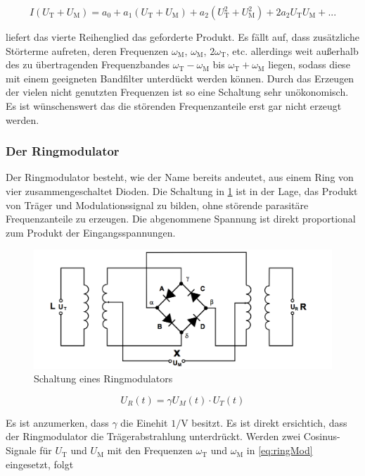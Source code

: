 \begin{equation}
I(U_\text{T} + U_\text{M}) = a_0 + a_1(U_\text{T} + U_\text{M}) + a_2(U_\text{T}^2 + U_\text{M}^2) + 2a_2 U_\text{T} U_\text{M} + ...
\end{equation}

\noindent liefert das vierte Reihenglied das geforderte Produkt. Es fällt auf, dass zusätzliche Störterme aufreten, deren Frequenzen  $\omega_\text{M}$, $\omega_\text{M}$, $2\omega_\text{T}$, etc. allerdings weit außerhalb des zu übertragenden Frequenzbandes $\omega_\text{T} - \omega_\text{M}$ bis $\omega_\text{T} + \omega_\text{M}$ liegen, sodass diese mit einem geeigneten Bandfilter unterdückt werden können.
Durch das Erzeugen der vielen nicht genutzten Frequenzen ist so eine Schaltung sehr unökonomisch. Es ist wünschenswert das die störenden Frequenzanteile erst gar nicht erzeugt werden.

\subsubsection{Der Ringmodulator}
Der Ringmodulator besteht, wie der Name bereits andeutet, aus einem Ring von vier zusammengeschaltet Dioden. Die Schaltung in \ref{abb:ringMod} ist in der Lage, das Produkt von Träger und Modulationssignal zu bilden, ohne störende parasitäre Frequenzanteile zu erzeugen. Die abgenommene Spannung ist direkt proportional zum Produkt der Eingangsspannungen.

\begin{figure}
	\centering
	\includegraphics[width=\textwidth]{img/Abb5.png}
	\caption{Schaltung eines Ringmodulators \cite{FP}}
	\label{abb:ringMod}
\end{figure}

\begin{equation}
U_R(t) = \gamma U_M(t) \cdot U_T(t)
\label{eq:ringMod}
\end{equation}

\noindent Es ist anzumerken, dass $\gamma$ die Einehit $1 / \text{V}$ besitzt. Es ist direkt ersichtich, dass der Ringmodulator die Trägerabstrahlung unterdrückt. Werden zwei Cosinus-Signale für $U_\text{T}$ und $U_\text{M}$ mit den Frequenzen $\omega_\text{T}$ und $\omega_\text{M}$ in \ref{eq:ringMod} eingesetzt, folgt

